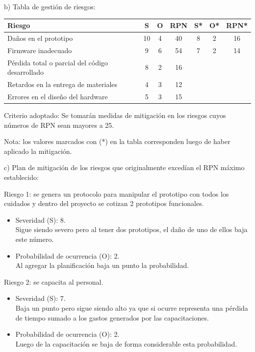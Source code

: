 \documentclass[11pt]{charter}
\begin{document}
b) Tabla de gestión de riesgos:  

\begin{table}[H]
\centering
\begin{tabularx}{\linewidth}{@{}|X|c|c|c|c|c|c|@{}}
\hline
\rowcolor[HTML]{C0C0C0} 
Riesgo & S & O & RPN & S* & O* & RPN* \\ \hline
Daños en el prototipo	& 10  & 4  &   40  &  8  &  2  &  16    \\ \hline
Firmware inadecuado	& 9  & 6  &   54  &  7  &  2  &   14   \\ \hline
Pérdida total o parcial del código desarrollado	& 8  & 2  &   16  &    &    &      \\ \hline
Retardos en la entrega de materiales	&  4 & 3  &  12   &    &    &      \\ \hline
Errores en el diseño del hardware	& 5  & 3  &   15  &    &    &      \\ \hline
\end{tabularx}%
\end{table}

Criterio adoptado: 
Se tomarán medidas de mitigación en los riesgos cuyos números de RPN sean mayores a 25.

Nota: los valores marcados con (*) en la tabla corresponden luego de haber aplicado la mitigación.

c) Plan de mitigación de los riesgos que originalmente excedían el RPN máximo establecido:
 
Riesgo 1: se genera un protocolo para manipular el prototipo con todos los cuidados y dentro del proyecto se cotizan 2 prototipos funcionales.
\begin{itemize}
\item Severidad (S): 8.\\
Sigue siendo severo pero al tener dos prototipos, el daño de uno de ellos baja este número.
\item Probabilidad de ocurrencia (O): 2.\\
Al agregar la planificación baja un punto la probabilidad. 
\end{itemize}

Riesgo 2: se capacita al personal.
\begin{itemize}
\item Severidad (S): 7.\\
Baja un punto pero sigue siendo alto ya que si ocurre representa una pérdida de tiempo sumado a los gastos generados por las capacitaciones.
\item Probabilidad de ocurrencia (O): 2.\\
Luego de la capacitación se baja de forma considerable esta probabilidad. 
\end{itemize}
\end{document}
